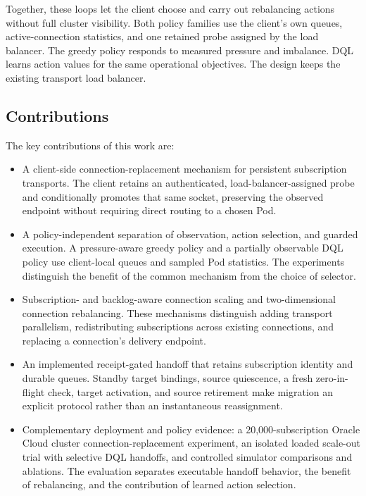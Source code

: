 \documentclass[manuscript]{acmart}
\begin{document}
Together, these loops let the client choose and carry out rebalancing actions without full cluster visibility. Both policy families use the client's own queues, active-connection statistics, and one retained probe assigned by the load balancer. The greedy policy responds to measured pressure and imbalance. DQL learns action values for the same operational objectives. The design keeps the existing transport load balancer.

\subsection*{Contributions}

The key contributions of this work are:

\begin{itemize}
	\item A client-side connection-replacement mechanism for persistent subscription transports. The client retains an authenticated, load-balancer-assigned probe and conditionally promotes that same socket, preserving the observed endpoint without requiring direct routing to a chosen Pod.
	
	\item A policy-independent separation of observation, action selection, and guarded execution. A pressure-aware greedy policy and a partially observable DQL policy use client-local queues and sampled Pod statistics. The experiments distinguish the benefit of the common mechanism from the choice of selector.
	
	\item Subscription- and backlog-aware connection scaling and two-dimensional connection rebalancing. These mechanisms distinguish adding transport parallelism, redistributing subscriptions across existing connections, and replacing a connection's delivery endpoint.
	
	\item An implemented receipt-gated handoff that retains subscription identity and durable queues. Standby target bindings, source quiescence, a fresh zero-in-flight check, target activation, and source retirement make migration an explicit protocol rather than an instantaneous reassignment.
	
	\item Complementary deployment and policy evidence: a 20,000-subscription Oracle Cloud cluster connection-replacement experiment, an isolated loaded scale-out trial with selective DQL handoffs, and controlled simulator comparisons and ablations. The evaluation separates executable handoff behavior, the benefit of rebalancing, and the contribution of learned action selection.
\end{itemize}
\end{document}
